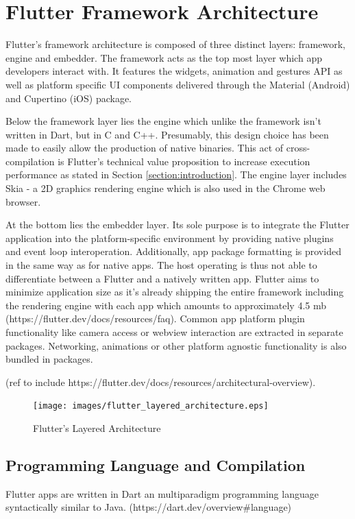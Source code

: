 \section{Flutter Framework Architecture} \label{section::flutter_architecture}
Flutter's framework architecture is composed of three distinct layers: framework, engine and embedder. The framework acts as the top most layer which 
app developers interact with. It features the widgets, animation and gestures API as well as platform specific UI components delivered through
the Material (Android) and Cupertino (iOS) package.

Below the framework layer lies the engine which unlike the framework isn't written in Dart, but in C and C++. Presumably, this design choice has been 
made to easily allow the production of native binaries. This act of cross-compilation is Flutter's technical value proposition to increase execution performance as stated in 
Section \ref{section:introduction}. The engine layer includes Skia - a 2D graphics rendering engine which is also used in the Chrome web browser.

At the bottom lies the embedder layer. Its sole purpose is to integrate the Flutter application into the platform-specific environment
by providing native plugins and event loop interoperation. 
Additionally, app package formatting is provided in the same way as for native apps. 
The host operating is thus not able to differentiate between a Flutter and a natively written app.
Flutter aims to minimize application size as it's already shipping the entire framework including the rendering engine with each app which amounts
to approximately 4.5 mb (https://flutter.dev/docs/resources/faq). Common app platform plugin functionality like camera access or webview 
interaction are extracted in separate packages. Networking, animations or other platform agnostic functionality is also bundled in packages. 

(ref to include https://flutter.dev/docs/resources/architectural-overview).
\begin{figure}
    \texttt{[image: images/flutter\_layered\_architecture.eps]}
    \caption{Flutter's Layered Architecture}
    \label{fig:flutter_layered_architecture}
\end{figure}


\subsection{Programming Language and Compilation}
Flutter apps are written in Dart an multiparadigm programming language syntactically similar to Java. (https://dart.dev/overview\#language)

